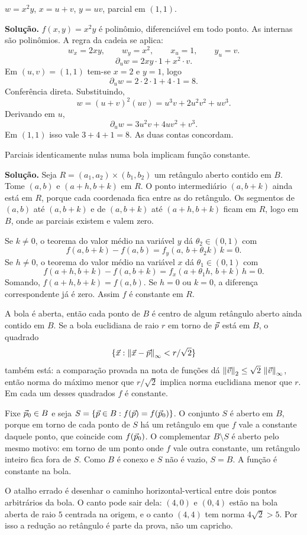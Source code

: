 \documentclass[11pt,a4paper]{article}
\begin{document}
\begin{exercicio}
$w=x^2 y$, $x=u+v$, $y=uv$, parcial em $(1,1)$.

\textbf{Solução.}
$f(x,y)=x^2 y$ é polinômio, diferenciável em todo ponto. As internas são polinômios. A regra da cadeia se aplica:
\[
w_x=2xy,\qquad w_y=x^2,\qquad x_u=1,\qquad y_u=v.
\]
\[
\partial_u w=2xy\cdot 1+x^2\cdot v.
\]
Em $(u,v)=(1,1)$ tem-se $x=2$ e $y=1$, logo
\[
\partial_u w=2\cdot 2\cdot 1+4\cdot 1=8.
\]
Conferência direta. Substituindo,
\[
w=(u+v)^2(uv)=u^3 v+2u^2 v^2+uv^3.
\]
Derivando em $u$,
\[
\partial_u w=3u^2 v+4uv^2+v^3.
\]
Em $(1,1)$ isso vale $3+4+1=8$. As duas contas concordam.
\end{exercicio}

\begin{exercicio}
Parciais identicamente nulas numa bola implicam função constante.

\textbf{Solução.}
Seja $R=(a_1,a_2)\times(b_1,b_2)$ um retângulo aberto contido em $B$. Tome $(a,b)$ e $(a+h,b+k)$ em $R$. O ponto intermediário $(a,b+k)$ ainda está em $R$, porque cada coordenada fica entre as do retângulo. Os segmentos de $(a,b)$ até $(a,b+k)$ e de $(a,b+k)$ até $(a+h,b+k)$ ficam em $R$, logo em $B$, onde as parciais existem e valem zero.

Se $k\neq 0$, o teorema do valor médio na variável $y$ dá $\theta_2\in(0,1)$ com
\[
f(a,b+k)-f(a,b)=f_y(a,\,b+\theta_2 k)\,k=0.
\]
Se $h\neq 0$, o teorema do valor médio na variável $x$ dá $\theta_1\in(0,1)$ com
\[
f(a+h,b+k)-f(a,b+k)=f_x(a+\theta_1 h,\,b+k)\,h=0.
\]
Somando, $f(a+h,b+k)=f(a,b)$. Se $h=0$ ou $k=0$, a diferença correspondente já é zero. Assim $f$ é constante em $R$.

A bola é aberta, então cada ponto de $B$ é centro de algum retângulo aberto ainda contido em $B$. Se a bola euclidiana de raio $r$ em torno de $\vec{p}$ está em $B$, o quadrado
\[
\{\vec{x}:\left\lVert \vec{x}-\vec{p} \right\rVert_{\infty}<r/\sqrt{2}\}
\]
também está: a comparação provada na nota de funções dá $\left\lVert \vec{v} \right\rVert_2\le\sqrt{2}\,\left\lVert \vec{v} \right\rVert_{\infty}$, então norma do máximo menor que $r/\sqrt{2}$ implica norma euclidiana menor que $r$. Em cada um desses quadrados $f$ é constante.

Fixe $\vec{p}_0\in B$ e seja $S=\{\vec{p}\in B:f(\vec{p})=f(\vec{p}_0)\}$. O conjunto $S$ é aberto em $B$, porque em torno de cada ponto de $S$ há um retângulo em que $f$ vale a constante daquele ponto, que coincide com $f(\vec{p}_0)$. O complementar $B\setminus S$ é aberto pelo mesmo motivo: em torno de um ponto onde $f$ vale outra constante, um retângulo inteiro fica fora de $S$. Como $B$ é conexo e $S$ não é vazio, $S=B$. A função é constante na bola.

O atalho errado é desenhar o caminho horizontal-vertical entre dois pontos arbitrários da bola. O canto pode sair dela: $(4,0)$ e $(0,4)$ estão na bola aberta de raio $5$ centrada na origem, e o canto $(4,4)$ tem norma $4\sqrt{2}>5$. Por isso a redução ao retângulo é parte da prova, não um capricho.
\end{exercicio}
\end{document}
